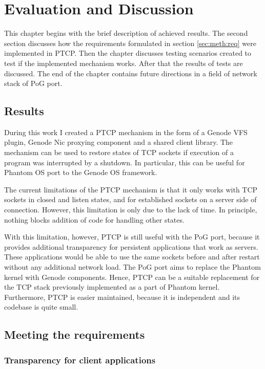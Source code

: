 \chapter{Evaluation and Discussion}
\label{chap:eval}

This chapter begins with the brief description of achieved results. The second
section discusses how the requirements formulated in section
\ref{sec:meth:req} were implemented in PTCP. Then the chapter discusses testing
scenarios created to test if the implemented mechanism works. After that the
results of tests are discussed. The end of the chapter contains future
directions in a field of network stack of PoG port.

\section{Results}
\label{sec:eval:res}

During this work I created a PTCP mechanism in the form of a Genode VFS plugin,
Genode Nic proxying component and a shared client library. The mechanism can be
used to restore states of TCP sockets if execution of a program was interrupted
by a shutdown. In particular, this can be useful for Phantom OS port to the
Genode OS framework. 

The current limitations of the PTCP mechanism is that it only works with
TCP sockets in closed and listen states, and for established sockets on a
server side of connection. However, this limitation is only due to the lack of
time. In principle, nothing blocks addition of code for handling
other states.

With this limitation, however, PTCP is still useful with the PoG port, because
it provides additional transparency for persistent applications that work as
servers. These applications would be able to use the same sockets before and
after restart without any additional network load. The PoG port aims to
replace the Phantom kernel with Genode components. Hence, PTCP can be a
suitable replacement for the TCP stack previously implemented as a part of
Phantom kernel. Furthermore, PTCP is easier maintained, because it is
independent and its codebase is quite small.

\section{Meeting the requirements}

\subsection{Transparency for client applications}

